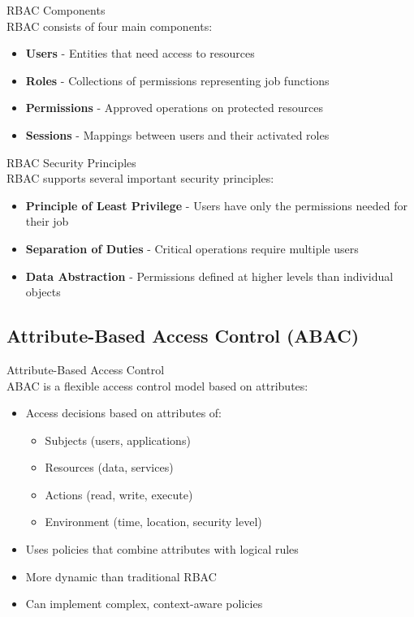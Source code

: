 \begin{concept}{RBAC Components}\\
RBAC consists of four main components:
\begin{itemize}
    \item \textbf{Users} - Entities that need access to resources
    \item \textbf{Roles} - Collections of permissions representing job functions
    \item \textbf{Permissions} - Approved operations on protected resources
    \item \textbf{Sessions} - Mappings between users and their activated roles
\end{itemize}
\end{concept}

\begin{theorem}{RBAC Security Principles}\\
RBAC supports several important security principles:
\begin{itemize}
    \item \textbf{Principle of Least Privilege} - Users have only the permissions needed for their job
    \item \textbf{Separation of Duties} - Critical operations require multiple users
    \item \textbf{Data Abstraction} - Permissions defined at higher levels than individual objects
\end{itemize}
\end{theorem}

\subsection{Attribute-Based Access Control (ABAC)}

\begin{definition}{Attribute-Based Access Control}\\
ABAC is a flexible access control model based on attributes:
\begin{itemize}
    \item Access decisions based on attributes of:
    \begin{itemize}
        \item Subjects (users, applications)
        \item Resources (data, services)
        \item Actions (read, write, execute)
        \item Environment (time, location, security level)
    \end{itemize}
    \item Uses policies that combine attributes with logical rules
    \item More dynamic than traditional RBAC
    \item Can implement complex, context-aware policies
\end{itemize}
\end{definition}

